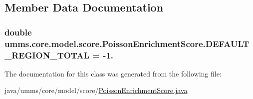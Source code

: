 \subsection{Member Data Documentation}
\hypertarget{classumms_1_1core_1_1model_1_1score_1_1_poisson_enrichment_score_a0e05411e854bace193b49201b931ba9a}{
\subsubsection[{D\+E\+F\+A\+U\+L\+T\+\_\+\+R\+E\+G\+I\+O\+N\+\_\+\+T\+O\+T\+A\+L}]{\setlength{\rightskip}{0pt plus 5cm}double umms.\+core.\+model.\+score.\+Poisson\+Enrichment\+Score.\+D\+E\+F\+A\+U\+L\+T\+\_\+\+R\+E\+G\+I\+O\+N\+\_\+\+T\+O\+T\+A\+L = -\/1.\hspace{0.3cm}{\ttfamily [static]}}}\label{classumms_1_1core_1_1model_1_1score_1_1_poisson_enrichment_score_a0e05411e854bace193b49201b931ba9a}


The documentation for this class was generated from the following file\+:\begin{DoxyCompactItemize}
\item 
java/umms/core/model/score/\hyperlink{_poisson_enrichment_score_8java}{Poisson\+Enrichment\+Score.\+java}\end{DoxyCompactItemize}
